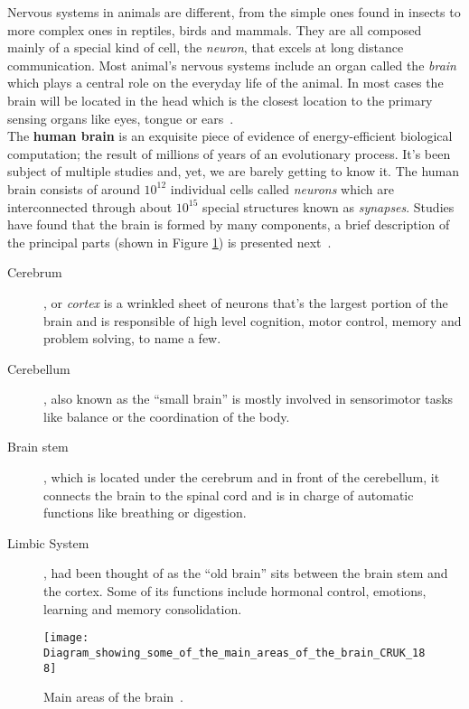 Nervous systems in animals are different, from the simple ones found in insects to more complex ones in reptiles, birds and mammals. They are all composed mainly of a special kind of cell, the \emph{ neuron}, that excels at long distance communication. Most animal's nervous systems include an organ called the \emph{brain} which plays a central role on the everyday life of the animal. In most cases the brain will be located in the head which is the closest location to the primary sensing organs like eyes, tongue or ears~\cite{scholarpedia-brain}.\\


The \textbf{human brain} is an exquisite piece of evidence of energy-efficient biological computation; the result of millions of years of an evolutionary process. It's been subject of multiple studies and, yet, we are barely getting to know it. The human brain consists of around $10^{12}$ individual cells called \emph{neurons} which are interconnected through about $10^{15}$ special structures known as \emph{synapses}.
Studies have found that the brain is formed by many components, a brief description of the principal parts (shown in Figure \ref{fig:brain:components}) is presented next~\cite{thompson2000brain}. 
\begin{description}
  \item[Cerebrum], or \emph{cortex} is a wrinkled sheet of neurons that's the largest portion of the brain and is responsible of high level cognition, motor control, memory and problem solving, to name a few.
  \item[Cerebellum], also known as the ``small brain'' is mostly involved in sensorimotor tasks like balance or the coordination of the body.
  \item[Brain stem], which is located under the cerebrum and in front of the cerebellum, it connects the brain to the spinal cord and is in charge of automatic functions like breathing or digestion.
  \item[Limbic System], had been thought of as the ``old brain'' sits between the brain stem and the cortex. Some of its functions include hormonal control, emotions, learning and memory consolidation. 
\end{description}

\begin{figure}[hbt]
  \begin{center}
    \texttt{[image: Diagram\_showing\_some\_of\_the\_main\_areas\_of\_the\_brain\_CRUK\_188]}
    \caption{Main areas of the brain~\cite{wikipedia-images}.}
    \label{fig:brain:components}
  \end{center}
  
\end{figure}



